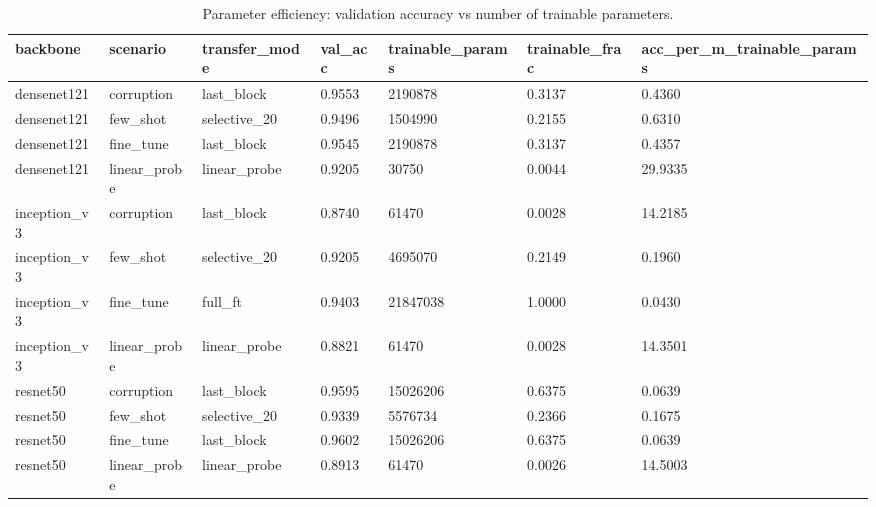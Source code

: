 \begin{table}[t]
\centering
\caption{Parameter efficiency: validation accuracy vs number of trainable parameters.}
\label{tab:parameter\_efficiency}
\begin{tabular}{lllllll}
\toprule
backbone & scenario & transfer\_mode & val\_acc & trainable\_params & trainable\_frac & acc\_per\_m\_trainable\_params \\
\midrule
densenet121 & corruption & last\_block & 0.9553 & 2190878 & 0.3137 & 0.4360 \\
densenet121 & few\_shot & selective\_20 & 0.9496 & 1504990 & 0.2155 & 0.6310 \\
densenet121 & fine\_tune & last\_block & 0.9545 & 2190878 & 0.3137 & 0.4357 \\
densenet121 & linear\_probe & linear\_probe & 0.9205 & 30750 & 0.0044 & 29.9335 \\
inception\_v3 & corruption & last\_block & 0.8740 & 61470 & 0.0028 & 14.2185 \\
inception\_v3 & few\_shot & selective\_20 & 0.9205 & 4695070 & 0.2149 & 0.1960 \\
inception\_v3 & fine\_tune & full\_ft & 0.9403 & 21847038 & 1.0000 & 0.0430 \\
inception\_v3 & linear\_probe & linear\_probe & 0.8821 & 61470 & 0.0028 & 14.3501 \\
resnet50 & corruption & last\_block & 0.9595 & 15026206 & 0.6375 & 0.0639 \\
resnet50 & few\_shot & selective\_20 & 0.9339 & 5576734 & 0.2366 & 0.1675 \\
resnet50 & fine\_tune & last\_block & 0.9602 & 15026206 & 0.6375 & 0.0639 \\
resnet50 & linear\_probe & linear\_probe & 0.8913 & 61470 & 0.0026 & 14.5003 \\
\bottomrule
\end{tabular}
\end{table}
